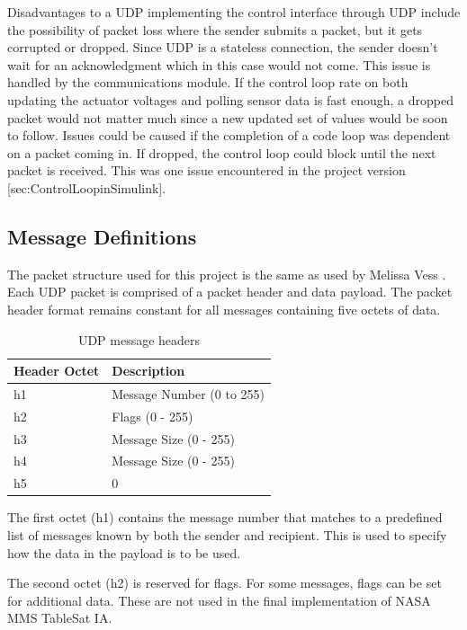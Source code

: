 Disadvantages to a UDP implementing the control interface through UDP include the possibility of packet loss where the sender submits a packet, but it gets corrupted or dropped.  Since UDP is a stateless connection, the sender doesn't wait for an acknowledgment which in this case would not come. This issue is handled by the communications module.  If the control loop rate on both updating the actuator voltages and polling sensor data is fast enough, a dropped packet would not matter much since a new updated set of values would be soon to follow.  Issues could be caused if the completion of a code loop was dependent on a packet coming in.  If dropped, the control loop could block until the next packet is received.  This was one issue encountered in the project version [sec:ControlLoopinSimulink].


\subsection{Message Definitions}
\label{subsec:MessageDefinitions}


The packet structure used for this project is the same as used by Melissa Vess \cite{vessthesis}. Each UDP packet is comprised of a packet header and data payload.  The packet header format remains constant for all messages containing five octets of data.

\begin{table}[H]
  \centering
  \begin{tabular}{| l | l |}
    \hline
    Header Octet & Description \\ \hline
    h1 & Message Number (0 to 255) \\ \hline
    h2 & Flags (0 - 255) \\ \hline
    h3 & Message Size (0 - 255) \\ \hline
    h4 & Message Size (0 - 255) \\ \hline
    h5 & 0 \\ \hline
  \end{tabular}
  \caption{UDP message headers}
  \label{tbl:UDPMessageHeaders}
\end{table}

The first octet (h1) contains the message number that matches to a predefined list of messages known by both the sender and recipient.  This is used to specify how the data in the payload is to be used.

The second octet (h2) is reserved for flags.  For some messages, flags can be set for additional data.  These are not used in the final implementation of NASA MMS TableSat IA.


